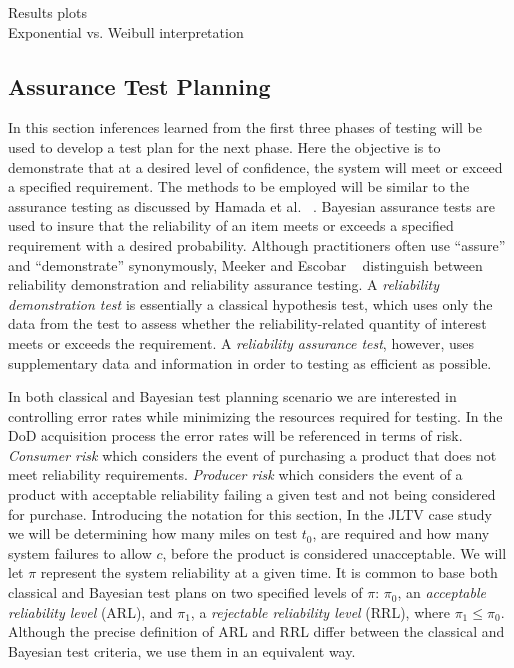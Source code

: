 \documentclass[12pt]{article}
\begin{document}
Results plots \\
Exponential vs. Weibull interpretation

\subsection{Assurance Test Planning}
In this section inferences learned from the first three phases of testing will
be used to develop a test plan for the next phase.  Here the objective is to
demonstrate that at a desired level of confidence, the system will meet or
exceed a specified requirement. The methods to be employed will be similar to
the assurance testing as discussed by Hamada et al. ~\cite{ref2}. Bayesian
assurance tests are used to insure that the reliability of an item meets or
exceeds a specified requirement with a desired probability. Although
practitioners often use ``assure'' and ``demonstrate'' synonymously, Meeker and
Escobar ~\cite{ME04} distinguish between reliability demonstration and
reliability assurance testing. A \emph{reliability demonstration test} is
essentially a classical hypothesis test, which uses only the data from the test
to assess whether the reliability-related quantity of interest meets or exceeds
the requirement. A \emph{reliability assurance test}, however, uses
supplementary data and information in order to testing as efficient as possible.

In both classical and Bayesian test planning scenario we are interested in
controlling error rates while minimizing the resources required for testing.  In
the DoD acquisition process the error rates will be referenced in terms of risk.
\textit{Consumer risk} which considers the event of purchasing a product that
does not meet reliability requirements.  \textit{Producer risk} which considers
the event of a product with acceptable reliability failing a given test and not
being considered for purchase.  Introducing the notation for this section, In
the JLTV case study we will be determining how many miles on test $t_0$, are
required and how many system failures to allow $c$, before the product is
considered unacceptable.  We will let $\pi$ represent  the system reliability at
a given time. It is common to base both classical and Bayesian test plans on two
specified levels of $\pi$: $\pi_0$, an \emph{acceptable reliability level}
(ARL), and $\pi_1$, a \emph{rejectable reliability level} (RRL), where $\pi_1
\leq  \pi_0$.  Although the precise definition of ARL and RRL differ between the
classical and Bayesian test criteria, we use them in an equivalent way.
\end{document}
